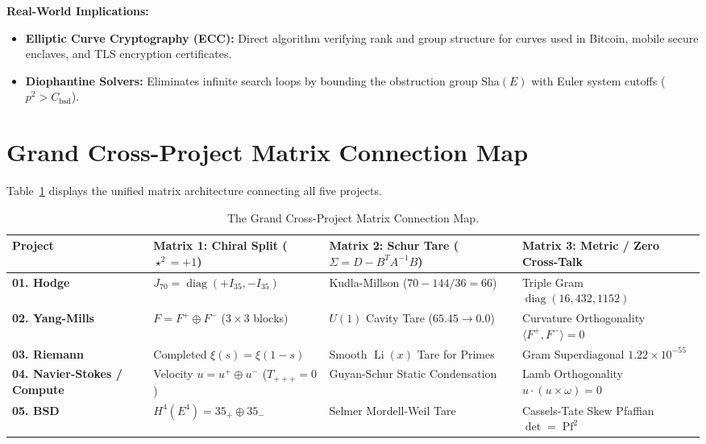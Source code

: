 \documentclass[11pt,a4paper]{article}
\providecommand{\Sha}{\mathrm{Sha}}
\begin{document}
\noindent\textbf{Real-World Implications:}
\begin{itemize}
    \item \textbf{Elliptic Curve Cryptography (ECC):} Direct algorithm verifying rank and group structure for curves used in Bitcoin, mobile secure enclaves, and TLS encryption certificates.
    \item \textbf{Diophantine Solvers:} Eliminates infinite search loops by bounding the obstruction group $\Sha(E)$ with Euler system cutoffs ($p^2 > C_{\mathrm{bsd}}$).
\end{itemize}

\section{Grand Cross-Project Matrix Connection Map}
Table~\ref{tab:master_matrix_map} displays the unified matrix architecture connecting all five projects.

\begin{table}[h!]
\centering
\small
\begin{tabular}{p{2.6cm}p{4.2cm}p{4.2cm}p{4.2cm}}
\toprule
\textbf{Project} & \textbf{Matrix 1: Chiral Split ($\star^2 = +1$)} & \textbf{Matrix 2: Schur Tare ($\Sigma = D - B^T A^{-1} B$)} & \textbf{Matrix 3: Metric / Zero Cross-Talk} \\
\midrule
\textbf{01. Hodge} & $J_{70} = \operatorname{diag}(+I_{35}, -I_{35})$ & Kudla-Millson ($70 - 144/36 = 66$) & Triple Gram $\operatorname{diag}(16, 432, 1152)$ \\
\textbf{02. Yang-Mills} & $F = F^+ \oplus F^-$ ($3 \times 3$ blocks) & $U(1)$ Cavity Tare ($65.45 \to 0.0$) & Curvature Orthogonality $\langle F^+, F^-\rangle = 0$ \\
\textbf{03. Riemann} & Completed $\xi(s) = \xi(1-s)$ & Smooth $\operatorname{Li}(x)$ Tare for Primes & Gram Superdiagonal $1.22\times 10^{-55}$ \\
\textbf{04. Navier-Stokes / Compute} & Velocity $u = u^+ \oplus u^-$ ($T_{+++} = 0$) & Guyan-Schur Static Condensation & Lamb Orthogonality $u \cdot (u \times \omega) = 0$ \\
\textbf{05. BSD} & $H^4(E^4) = 35_+ \oplus 35_-$ & Selmer Mordell-Weil Tare & Cassels-Tate Skew Pfaffian $\det = \operatorname{Pf}^2$ \\
\bottomrule
\end{tabular}
\caption{The Grand Cross-Project Matrix Connection Map.}
\label{tab:master_matrix_map}
\end{table}
\end{document}
